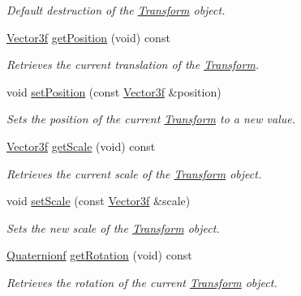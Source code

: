 \begin{DoxyCompactItemize}
\begin{DoxyCompactList}\small\item\em Default destruction of the \hyperlink{classsparky_1_1_transform}{Transform} object. \end{DoxyCompactList}\item 
\hyperlink{classsparky_1_1_vector3}{Vector3f} \hyperlink{classsparky_1_1_transform_add89b676d494ee5f5f5c45e82405127b}{get\+Position} (void) const 
\begin{DoxyCompactList}\small\item\em Retrieves the current translation of the \hyperlink{classsparky_1_1_transform}{Transform}. \end{DoxyCompactList}\item 
void \hyperlink{classsparky_1_1_transform_aff16fd5ad2157d604364a59835865d5c}{set\+Position} (const \hyperlink{classsparky_1_1_vector3}{Vector3f} \&position)
\begin{DoxyCompactList}\small\item\em Sets the position of the current \hyperlink{classsparky_1_1_transform}{Transform} to a new value. \end{DoxyCompactList}\item 
\hyperlink{classsparky_1_1_vector3}{Vector3f} \hyperlink{classsparky_1_1_transform_a0f32c05a0c33365df5cb58f03af43a59}{get\+Scale} (void) const 
\begin{DoxyCompactList}\small\item\em Retrieves the current scale of the \hyperlink{classsparky_1_1_transform}{Transform} object. \end{DoxyCompactList}\item 
void \hyperlink{classsparky_1_1_transform_af150a728b784dbcb73aefd653393083f}{set\+Scale} (const \hyperlink{classsparky_1_1_vector3}{Vector3f} \&scale)
\begin{DoxyCompactList}\small\item\em Sets the new scale of the \hyperlink{classsparky_1_1_transform}{Transform} object. \end{DoxyCompactList}\item 
\hyperlink{classsparky_1_1_quaternion}{Quaternionf} \hyperlink{classsparky_1_1_transform_a9f5febdbccb5bc718e1cfb2ff57e49f2}{get\+Rotation} (void) const 
\begin{DoxyCompactList}\small\item\em Retrieves the rotation of the current \hyperlink{classsparky_1_1_transform}{Transform} object. \end{DoxyCompactList}\item 

\end{DoxyCompactItemize}
